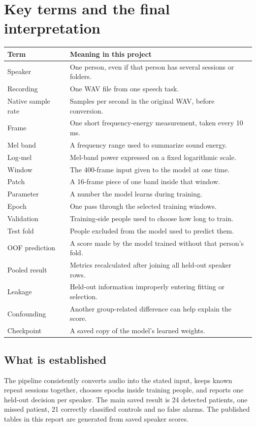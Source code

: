 \documentclass[11pt,a4paper]{article}
\begin{document}
\section{Key terms and the final interpretation}
\begin{center}
\begin{tabularx}{\linewidth}{@{}L{3.0cm}Y@{}}
\toprule
Term & Meaning in this project\\
\midrule
Speaker & One person, even if that person has several sessions or folders.\\
Recording & One WAV file from one speech task.\\
Native sample rate & Samples per second in the original WAV, before conversion.\\
Frame & One short frequency-energy measurement, taken every 10 ms.\\
Mel band & A frequency range used to summarize sound energy.\\
Log-mel & Mel-band power expressed on a fixed logarithmic scale.\\
Window & The 400-frame input given to the model at one time.\\
Patch & A 16-frame piece of one band inside that window.\\
Parameter & A number the model learns during training.\\
Epoch & One pass through the selected training windows.\\
Validation & Training-side people used to choose how long to train.\\
Test fold & People excluded from the model used to predict them.\\
OOF prediction & A score made by the model trained without that person's fold.\\
Pooled result & Metrics recalculated after joining all held-out speaker rows.\\
Leakage & Held-out information improperly entering fitting or selection.\\
Confounding & Another group-related difference can help explain the score.\\
Checkpoint & A saved copy of the model's learned weights.\\
\bottomrule
\end{tabularx}
\end{center}

\subsection*{What is established}
The pipeline consistently converts audio into the stated input, keeps known
repeat sessions together, chooses epochs inside training people, and reports
one held-out decision per speaker. The main saved result is 24 detected patients,
one missed patient, 21 correctly classified controls and no false alarms.
The published tables in this report are generated from saved speaker scores.
\end{document}
